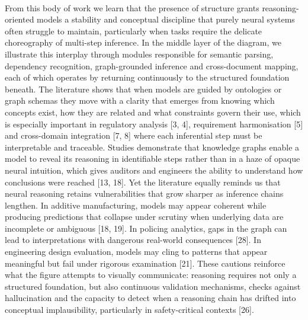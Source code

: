         \newpage
        \paragraph{} 
        From this body of work we learn that the presence of structure grants reasoning-oriented models a stability and conceptual discipline that purely neural systems often struggle to maintain, particularly when tasks require the delicate choreography of multi-step inference. In the middle layer of the diagram, we illustrate this interplay through modules responsible for semantic parsing, dependency recognition, graph-grounded inference and cross-document mapping, each of which operates by returning continuously to the structured foundation beneath. The literature shows that when models are guided by ontologies or graph schemas they move with a clarity that emerges from knowing which concepts exist, how they are related and what constraints govern their use, which is especially important in regulatory analysis [3, 4], requirement harmonisation [5] and cross-domain integration [7, 8] where each inferential step must be interpretable and traceable. Studies demonstrate that knowledge graphs enable a model to reveal its reasoning in identifiable steps rather than in a haze of opaque neural intuition, which gives auditors and engineers the ability to understand how conclusions were reached [13, 18]. Yet the literature equally reminds us that neural reasoning retains vulnerabilities that grow sharper as inference chains lengthen. In additive manufacturing, models may appear coherent while producing predictions that collapse under scrutiny when underlying data are incomplete or ambiguous [18, 19]. In policing analytics, gaps in the graph can lead to interpretations with dangerous real-world consequences [28]. In engineering design evaluation, models may cling to patterns that appear meaningful but fail under rigorous examination [21]. These cautions reinforce what the figure attempts to visually communicate: reasoning requires not only a structured foundation, but also continuous validation mechanisms, checks against hallucination and the capacity to detect when a reasoning chain has drifted into conceptual implausibility, particularly in safety-critical contexts [26].

        \newpage
